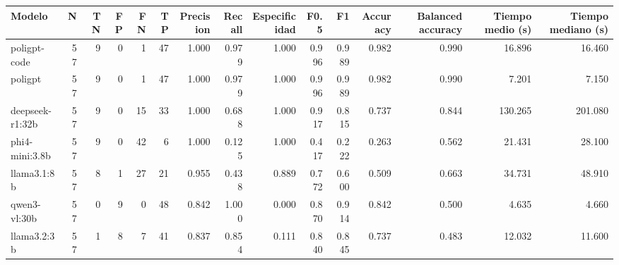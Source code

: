 \begin{tabular}{lrrrrrrrrrrrrrr}
\toprule
Modelo & N & TN & FP & FN & TP & Precision & Recall & Especificidad & F0.5 & F1 & Accuracy & Balanced accuracy & Tiempo medio (s) & Tiempo mediano (s) \\
\midrule
poligpt-code & 57 & 9 & 0 & 1 & 47 & 1.000 & 0.979 & 1.000 & 0.996 & 0.989 & 0.982 & 0.990 & 16.896 & 16.460 \\
poligpt & 57 & 9 & 0 & 1 & 47 & 1.000 & 0.979 & 1.000 & 0.996 & 0.989 & 0.982 & 0.990 & 7.201 & 7.150 \\
deepseek-r1:32b & 57 & 9 & 0 & 15 & 33 & 1.000 & 0.688 & 1.000 & 0.917 & 0.815 & 0.737 & 0.844 & 130.265 & 201.080 \\
phi4-mini:3.8b & 57 & 9 & 0 & 42 & 6 & 1.000 & 0.125 & 1.000 & 0.417 & 0.222 & 0.263 & 0.562 & 21.431 & 28.100 \\
llama3.1:8b & 57 & 8 & 1 & 27 & 21 & 0.955 & 0.438 & 0.889 & 0.772 & 0.600 & 0.509 & 0.663 & 34.731 & 48.910 \\
qwen3-vl:30b & 57 & 0 & 9 & 0 & 48 & 0.842 & 1.000 & 0.000 & 0.870 & 0.914 & 0.842 & 0.500 & 4.635 & 4.660 \\
llama3.2:3b & 57 & 1 & 8 & 7 & 41 & 0.837 & 0.854 & 0.111 & 0.840 & 0.845 & 0.737 & 0.483 & 12.032 & 11.600 \\
\bottomrule
\end{tabular}
